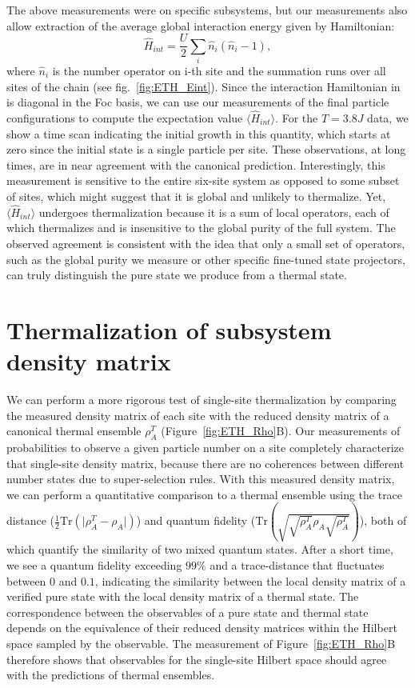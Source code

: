 The above measurements were on specific subsystems, but our measurements also allow extraction of the average global interaction energy given by Hamiltonian:
\begin{equation}
\hat{H}_{int}=\frac{U}{2}\sum_i \hat{n}_i(\hat{n}_i-1),
\end{equation}
where $\hat{n}_i$ is the number operator on i-th site and the summation runs over all sites of the chain (see fig.~\ref{fig:ETH_Eint}). Since the interaction Hamiltonian in is diagonal in the Foc basis, we can use our measurements of the final particle configurations to compute the expectation value $\langle \hat{H}_{int} \rangle$. For the $T=3.8J$ data, we show a time scan indicating the initial growth in this quantity, which starts at zero since the initial state is a single particle per site.  These observations, at long times, are in near agreement with the canonical prediction. Interestingly, this measurement is sensitive to the entire six-site system as opposed to some subset of sites, which might suggest that it is global and unlikely to thermalize. Yet, $\langle \hat{H}_{int} \rangle$ undergoes thermalization because it is a sum of local operators, each of which thermalizes and is insensitive to the global purity of the full system.  The observed agreement is consistent with the idea that only a small set of operators, such as the global purity we measure or other specific fine-tuned state projectors, can truly distinguish the pure state we produce from a thermal state.

\section{Thermalization of subsystem density matrix}

We can perform a more rigorous test of single-site thermalization by comparing the measured density matrix of each site with the reduced density matrix of a canonical thermal ensemble $\rho_A^T$ (Figure~\ref{fig:ETH_Rho}B). Our measurements of probabilities to observe a given particle number on a site completely characterize that single-site density matrix, because there are no coherences between different number states due to super-selection rules. With this measured density matrix, we can perform a quantitative comparison to a thermal ensemble using the trace distance ($\frac{1}{2}\mathrm{Tr}(\vert \rho_A^T -  \rho_A \vert)$) and quantum fidelity ($\mathrm{Tr}\left ( \sqrt{\sqrt{\rho_A^T} \rho_A \sqrt{\rho_A^T}}\right )$), both of which quantify the similarity of two mixed quantum states. After a short time, we see a quantum fidelity exceeding $99\%$ and a trace-distance that fluctuates between $0$ and $0.1$, indicating the similarity between the local density matrix of a verified pure state with the local density matrix of a thermal state. The correspondence between the observables of a pure state and thermal state depends on the equivalence of their reduced density matrices within the Hilbert space sampled by the observable. The measurement of Figure~\ref{fig:ETH_Rho}B therefore shows that observables for the single-site Hilbert space should agree with the predictions of thermal ensembles. 

